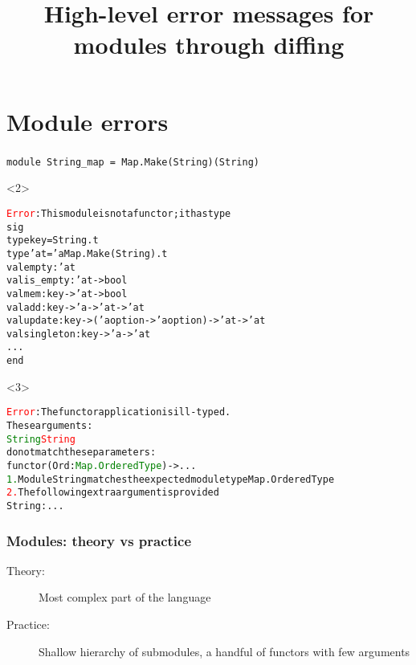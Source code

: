 \documentclass[11pt,aspectratio=169]{beamer}
\title[Functor diffing]{High-level error messages for modules through diffing}
\author[Angeletti \& Radanne]{\texorpdfstring{
  \begin{columns}\column{0.5\linewidth}\centering%
  Florian \textsc{Angeletti}\\
  Inria\\
  \href{mailto:florian.angeletti@inria.fr}
  {\nolinkurl{florian.angeletti@inria.fr}}
  \column{0.5\linewidth}\centering%
  Gabriel \textsc{Radanne}\\
  Inria\\
  \href{mailto:gabriel.radanne@inria.fr}
  {\nolinkurl{gabriel.radanne@inria.fr}}
  \end{columns}
  }{F. Angeletti \& G. Radanne}}
\date{}
\newcommand{\error}[1]{\textcolor{red}{#1}}
\newcommand{\ok}[1]{\textcolor{green}{#1}}
\begin{document}
\begin{frame}
\maketitle
\end{frame}

\section{Module errors}


\begin{frame}[fragile,t]\frametitle{}

\begin{verbatim}
module String_map = Map.Make(String)(String)
\end{verbatim}
\begin{onlyenv}<2>
\begin{alltt}
\error{Error}: This module is not a functor; it has type
       sig
         type key = String.t
         type 'a t = 'a Map.Make(String).t
         val empty : 'a t
         val is_empty : 'a t -> bool
         val mem : key -> 'a t -> bool
         val add : key -> 'a -> 'a t -> 'a t
         val update : key -> ('a option -> 'a option) -> 'a t -> 'a t
         val singleton : key -> 'a -> 'a t
         ...
       end
\end{alltt}
\end{onlyenv}

\begin{onlyenv}<3>
\begin{alltt}\error{Error}: The functor application is ill-typed.
       These arguments:
         \ok{String} \error{String}
       do not match these parameters:
         functor (Ord : \ok{Map.OrderedType})  -> ...
  \ok{1.} Module String matches the expected module type Map.OrderedType
  \error{2.} The following extra argument is provided
         String : ...
\end{alltt}
\end{onlyenv}

\end{frame}


\begin{frame}\frametitle{Modules: theory vs practice}
\begin{description}
\item[Theory:]{Most complex part of the language}
\item[Practice:]{Shallow hierarchy of submodules, a handful of functors with few arguments}
\end{description}

\end{frame}
\end{document}
